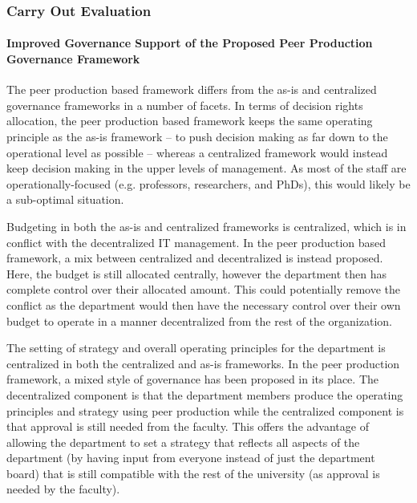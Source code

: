 \subsubsection*{Carry Out Evaluation}

\paragraph*{Improved Governance Support of the Proposed Peer Production Governance Framework}



The peer production based framework differs from the as-is and centralized governance frameworks in a number of facets. In terms of decision rights allocation, the peer production based framework keeps the same operating principle as the as-is framework -- to push decision making as far down to the operational level as possible -- whereas a centralized framework would instead keep decision making in the upper levels of management. As most of the staff are operationally-focused (e.g. professors, researchers, and PhDs), this would likely be a sub-optimal situation. 

Budgeting in both the as-is and centralized frameworks is centralized, which is in conflict with the decentralized IT management. In the peer production based framework, a mix between  centralized and decentralized is instead proposed. Here, the budget is still allocated centrally, however the department then has complete control over their allocated amount. This could potentially remove the conflict as the department would then have the necessary control over their own budget to operate in a manner decentralized from the rest of the organization. 

The setting of strategy and overall operating principles for the department is centralized in both the centralized and as-is frameworks. In the peer production framework, a mixed style of governance has been proposed in its place. The decentralized component is that the department members produce the operating principles and strategy using peer production while the centralized component is that approval is still needed from the faculty. This offers the advantage of allowing the department to set a strategy that reflects all aspects of the department (by having input from everyone instead of just the department board) that is still compatible with the rest of the university (as approval is needed by the faculty).

